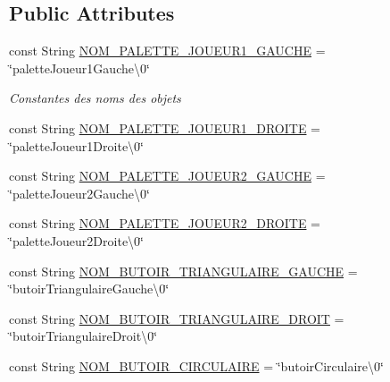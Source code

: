 \subsection*{Public Attributes}
\begin{DoxyCompactItemize}
\item 
const String \hyperlink{class_interface_graphique_1_1_mode_editeur_aa0bc708e8e88b3b0ae8ffd6f1c85e8f4}{N\-O\-M\-\_\-\-P\-A\-L\-E\-T\-T\-E\-\_\-\-J\-O\-U\-E\-U\-R1\-\_\-\-G\-A\-U\-C\-H\-E} = \char`\"{}palette\-Joueur1\-Gauche\textbackslash{}0\char`\"{}
\begin{DoxyCompactList}\small\item\em Constantes des noms des objets \end{DoxyCompactList}\item 
const String \hyperlink{class_interface_graphique_1_1_mode_editeur_aac4523ea42df4e7efac855b908175216}{N\-O\-M\-\_\-\-P\-A\-L\-E\-T\-T\-E\-\_\-\-J\-O\-U\-E\-U\-R1\-\_\-\-D\-R\-O\-I\-T\-E} = \char`\"{}palette\-Joueur1\-Droite\textbackslash{}0\char`\"{}
\item 
const String \hyperlink{class_interface_graphique_1_1_mode_editeur_aea7106d80768246e236c5fe566152ad8}{N\-O\-M\-\_\-\-P\-A\-L\-E\-T\-T\-E\-\_\-\-J\-O\-U\-E\-U\-R2\-\_\-\-G\-A\-U\-C\-H\-E} = \char`\"{}palette\-Joueur2\-Gauche\textbackslash{}0\char`\"{}
\item 
const String \hyperlink{class_interface_graphique_1_1_mode_editeur_a6753a3683e3a39173282013f65e13604}{N\-O\-M\-\_\-\-P\-A\-L\-E\-T\-T\-E\-\_\-\-J\-O\-U\-E\-U\-R2\-\_\-\-D\-R\-O\-I\-T\-E} = \char`\"{}palette\-Joueur2\-Droite\textbackslash{}0\char`\"{}
\item 
const String \hyperlink{class_interface_graphique_1_1_mode_editeur_a0f11286ee45a344a9b9b1685ca08b515}{N\-O\-M\-\_\-\-B\-U\-T\-O\-I\-R\-\_\-\-T\-R\-I\-A\-N\-G\-U\-L\-A\-I\-R\-E\-\_\-\-G\-A\-U\-C\-H\-E} = \char`\"{}butoir\-Triangulaire\-Gauche\textbackslash{}0\char`\"{}
\item 
const String \hyperlink{class_interface_graphique_1_1_mode_editeur_ad2c862e31c9a1be8ce4078c6d8b9a580}{N\-O\-M\-\_\-\-B\-U\-T\-O\-I\-R\-\_\-\-T\-R\-I\-A\-N\-G\-U\-L\-A\-I\-R\-E\-\_\-\-D\-R\-O\-I\-T} = \char`\"{}butoir\-Triangulaire\-Droit\textbackslash{}0\char`\"{}
\item 
const String \hyperlink{class_interface_graphique_1_1_mode_editeur_a7a8b2526b24769fd740b4dc4009eb995}{N\-O\-M\-\_\-\-B\-U\-T\-O\-I\-R\-\_\-\-C\-I\-R\-C\-U\-L\-A\-I\-R\-E} = \char`\"{}butoir\-Circulaire\textbackslash{}0\char`\"{}
\item 

\end{DoxyCompactItemize}
